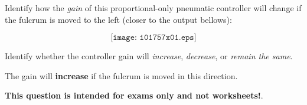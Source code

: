 

Identify how the {\it gain} of this proportional-only pneumatic controller will change if the fulcrum is moved to the left (closer to the output bellows):

$$\texttt{[image: i01757x01.eps]}$$

Identify whether the controller gain will {\it increase}, {\it decrease}, or {\it remain the same}.

\vskip 30pt







The gain will {\bf increase} if the fulcrum is moved in this direction.







{\bf This question is intended for exams only and not worksheets!}.



